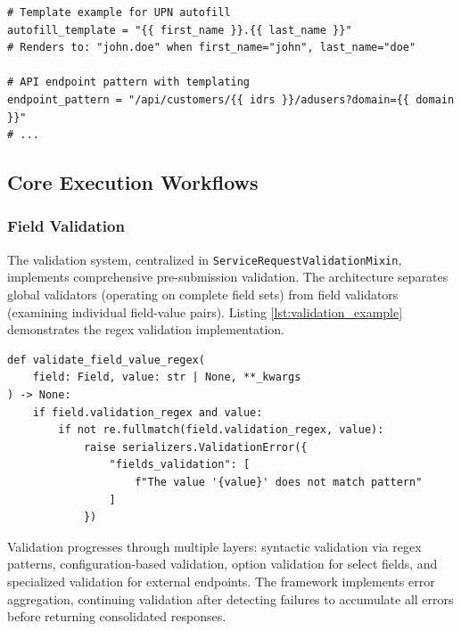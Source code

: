\begin{listing}[htbp]
\begin{verbatim}
# Template example for UPN autofill
autofill_template = "{{ first_name }}.{{ last_name }}"
# Renders to: "john.doe" when first_name="john", last_name="doe"

# API endpoint pattern with templating
endpoint_pattern = "/api/customers/{{ idrs }}/adusers?domain={{ domain }}"
# ...
\end{verbatim}
\caption{Jinja2 Templating Examples for Dynamic Field Configuration}
\label{lst:jinja_template}
\end{listing}

\subsection{Core Execution Workflows}

\subsubsection{Field Validation}

The validation system, centralized in \texttt{ServiceRequestValidationMixin}, implements comprehensive pre-submission validation. The architecture separates global validators (operating on complete field sets) from field validators (examining individual field-value pairs). Listing \ref{lst:validation_example} demonstrates the regex validation implementation.

\begin{listing}[htbp]
\begin{verbatim}
def validate_field_value_regex(
    field: Field, value: str | None, **_kwargs
) -> None:
    if field.validation_regex and value:
        if not re.fullmatch(field.validation_regex, value):
            raise serializers.ValidationError({
                "fields_validation": [
                    f"The value '{value}' does not match pattern"
                ]
            })
\end{verbatim}
\caption{Field Validation Using Regex Patterns}
\label{lst:validation_example}
\end{listing}

Validation progresses through multiple layers: syntactic validation via regex patterns, configuration-based validation, option validation for select fields, and specialized validation for external endpoints. The framework implements error aggregation, continuing validation after detecting failures to accumulate all errors before returning consolidated responses.

